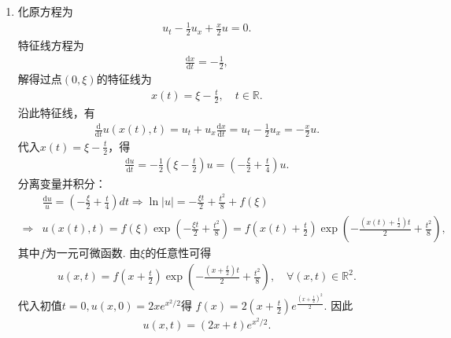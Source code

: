 \documentclass[../../main.tex]{subfiles}%
\begin{document}
\begin{solution}
\begin{enumerate}[(1)]
\item 化原方程为
\begin{align*}
u_t-\frac12 u_x+\frac{x}{2}u=0.
\end{align*}
特征线方程为
\begin{align*}
\frac{\mathrm{d}x}{\mathrm{d}t}=-\frac12,
\end{align*}
解得过点$(0,\xi)$的特征线为
\begin{align*}
x(t)=\xi-\frac{t}{2},\quad t\in\mathbb{R}.
\end{align*}
沿此特征线，有
\begin{align*}
\frac{\mathrm{d}}{\mathrm{d}t}u(x(t),t)=u_t+u_x\frac{\mathrm{d}x}{\mathrm{d}t}
=u_t-\frac12 u_x=-\frac{x}{2}u.
\end{align*}
代入$x(t)=\xi-\frac{t}{2}$，得
\begin{align*}
\frac{\mathrm{d}u}{\mathrm{d}t}=-\frac{1}{2}\left(\xi-\frac{t}{2}\right)u
=\left(-\frac{\xi}{2}+\frac{t}{4}\right)u.
\end{align*}
分离变量并积分：
\begin{align*}
&\frac{\mathrm{d}u}{u}=\left(-\frac{\xi}{2}+\frac{t}{4}\right)dt
\Longrightarrow
\ln|u|=-\frac{\xi t}{2}+\frac{t^2}{8}+f(\xi)\\
\Longrightarrow &u(x(t),t)=f(\xi)\exp\left(-\frac{\xi t}{2}+\frac{t^2}{8}\right)=f(x(t)+\frac{t}{2})\exp\left(-\frac{(x(t)+\frac{t}{2}) t}{2}+\frac{t^2}{8}\right),
\end{align*}
其中$f$为一元可微函数. 由$\xi$的任意性可得
\begin{align*}
u(x,t)=f\!\left(x+\frac{t}{2}\right)\exp\left(-\frac{(x+\frac{t}{2})t}{2}+\frac{t^2}{8}\right),\quad \forall (x,t)\in \mathbb{R}^2.
\end{align*}
代入初值$t=0,u(x,0)=2xe^{x^2/2}$得
$f(x)=2\left(x+\frac{t}{2}\right)e^{\frac{\left(x+\frac{t}{2}\right)^2}{2}}.$
因此
\begin{align*}
u(x,t)=(2x+t)e^{x^2/2}.
\end{align*}


\end{enumerate}
\end{solution}
\end{document}
